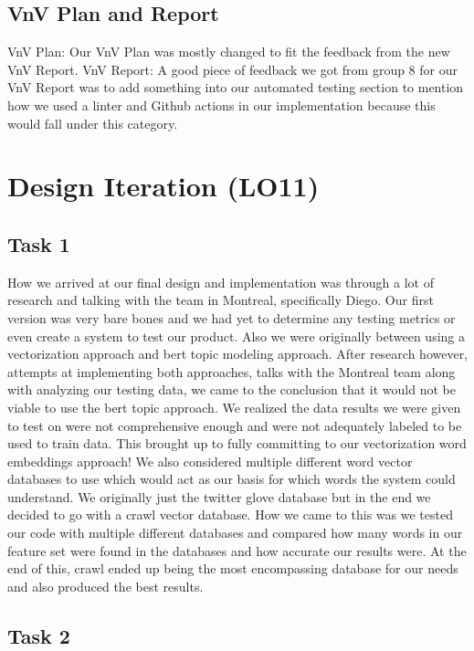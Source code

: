 \documentclass{article}
\begin{document}
\subsection{VnV Plan and Report}
   VnV Plan: Our VnV Plan was mostly changed to fit the feedback from the new VnV Report.
   VnV Report:
       A good piece of feedback we got from group 8 for our VnV Report was to add something into our automated testing section to
       mention how we used a linter and Github actions in our implementation because this would fall under this category.
       
\section{Design Iteration (LO11)}

\subsection{Task 1}
How we arrived at our final design and implementation was through a lot of research and talking with the team in Montreal, specifically Diego. Our first version was very bare bones and we had yet to determine any testing metrics or even create a system to test our product. Also we were originally between using a vectorization approach and bert topic modeling approach. After research however, attempts at implementing both approaches, talks with the Montreal team along with analyzing our testing data, we came to the conclusion that it would not be viable to use the bert topic approach. We realized the data results we were given to test on were not comprehensive enough and were not adequately labeled to be used to train data. This brought up to fully committing to our vectorization word embeddings approach! We also considered multiple different word vector databases to use which would act as our basis for which words the system could understand. We originally just the twitter glove database but in the end we decided to go with a crawl vector database. How we came to this was we tested our code with multiple different databases and compared how many words in our feature set were found in the databases and how accurate our results were. At the end of this, crawl ended up being the most encompassing database for our needs and also produced the best results.

\subsection{Task 2}
\end{document}
